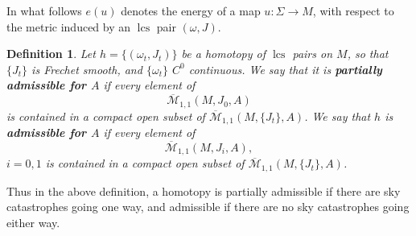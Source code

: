 \documentclass{amsart}
\numberwithin{equation}{section}
\newtheorem{definition}[equation]{Definition}
\theoremstyle{definition}
\theoremstyle{remark}
\DeclareMathOperator {\mult} {mult}
\DeclareMathOperator{\lcs}{lcs}
\begin{document}
In what follows $e (u)$ denotes the energy of a map $u: \Sigma \to M$, with respect to the metric induced by an $\lcs$ pair $(\omega,J)$.
\begin{definition} 
Let $h = \{(\omega _{t}, J _{t}  )\}$ be a homotopy of $\lcs$ pairs on $M$, so that $\{J _{t} \}$ is Frechet smooth, and $\{\omega _{t} \}$ $C ^{0} $ continuous. We say that it is \textbf{\emph{partially admissible for $A$}}
   if every element of $$ \overline{\mathcal{M}} _{1,1} (M, J _{0},A) $$
   is contained in a compact open subset of $\overline{\mathcal{M}} _{1,1} (M, \{J _{t} \},A) $.
 We say that $h$ is \textbf{\emph{admissible for $A$}} 
   if every element of $$ \overline{\mathcal{M}} _{1,1} (M, J _{i},A), $$ $i=0,1$
   is contained in a compact open subset of $ \overline{\mathcal{M}} _{1,1} (M, \{J _{t} \},A) $.
\end{definition}
Thus in the above definition, a homotopy is partially admissible if there are sky catastrophes going one way, and admissible if there are no sky catastrophes going either way. 
   
\end{document}
